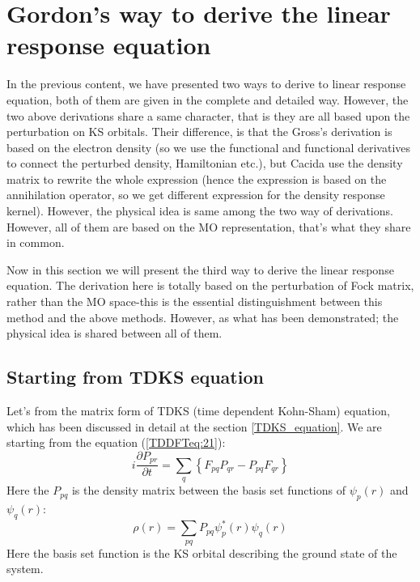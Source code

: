 \section{Gordon's way to derive the linear response equation}
%
%
%
%
In the previous content, we have presented two ways to derive to
linear response equation, both of them are given in the complete and
detailed way. However, the two above derivations share a same
character, that is they are all based upon the perturbation on KS
orbitals. Their difference, is that the Gross's derivation is based
on the electron density (so we use the functional and functional
derivatives to connect the perturbed density, Hamiltonian etc.), but
Cacida use the density matrix to rewrite the whole expression (hence
the expression is based on the annihilation operator, so we get
different expression for the density response kernel). However, the
physical idea is same among the two way of derivations. However, all
of them are based on the MO representation, that's what they share in
common.

Now in this section we will present the third way to derive the
linear response equation\cite{Gordon, Hirata1999291}. The derivation
here is totally based on the perturbation of Fock matrix, rather
than the MO space-this is the essential distinguishment between this
method and the above methods. However, as what has been demonstrated;
the physical idea is shared between all of them.

\subsection{Starting from TDKS equation}\label{Gordon_TDKS}
%
%
%
%
Let's from the matrix form of TDKS (time dependent Kohn-Sham)
equation, which has been discussed in detail at the section
\ref{TDKS_equation}. We are starting from the equation
(\ref{TDDFTeq:21}):
\begin{equation}\label{Grodon_TDDFT_equation:1}
i \frac{\partial P_{pr}}{\partial t} =
\sum_{q}\left\{F_{pq}P_{qr} -
P_{pq}F_{qr}\right\}
\end{equation}
Here the $P_{pq}$ is the density matrix between the basis set
functions of $\psi_{p}(r)$ and $\psi_{q}(r)$:
\begin{equation}
 \label{Grodon_TDDFT_equation:2}
\rho(r) = \sum_{pq}P_{pq}\psi^{*}_{p}(r)\psi_{q}(r)
\end{equation} 
Here the basis set function is the KS orbital describing the ground
state of the system.

